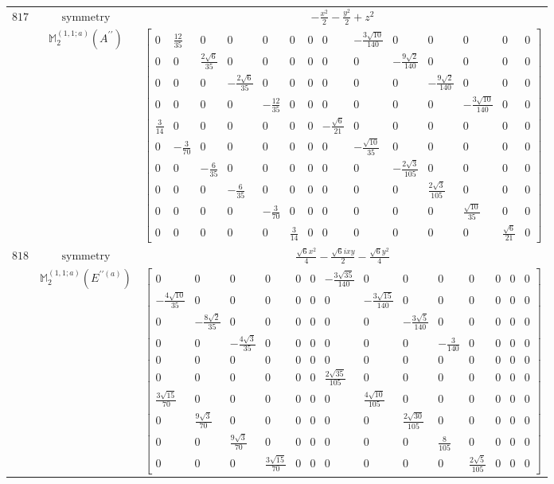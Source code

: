 \documentclass[fleqn,8pt,landscape]{jsarticle}
\begin{document}
\begin{longtable}{ccc}
$ 817 $ & $ \text{symmetry} $ & $ - \frac{x^{2}}{2} - \frac{y^{2}}{2} + z^{2} $ \\
$  $ & $ \mathbb{M}_{2}^{(1,1;a)}(A^{\prime\prime}) $ & $ \begin{bmatrix} 0 & \frac{12}{35} & 0 & 0 & 0 & 0 & 0 & 0 & - \frac{3 \sqrt{10}}{140} & 0 & 0 & 0 & 0 & 0 \\ 0 & 0 & \frac{2 \sqrt{6}}{35} & 0 & 0 & 0 & 0 & 0 & 0 & - \frac{9 \sqrt{2}}{140} & 0 & 0 & 0 & 0 \\ 0 & 0 & 0 & - \frac{2 \sqrt{6}}{35} & 0 & 0 & 0 & 0 & 0 & 0 & - \frac{9 \sqrt{2}}{140} & 0 & 0 & 0 \\ 0 & 0 & 0 & 0 & - \frac{12}{35} & 0 & 0 & 0 & 0 & 0 & 0 & - \frac{3 \sqrt{10}}{140} & 0 & 0 \\ \frac{3}{14} & 0 & 0 & 0 & 0 & 0 & 0 & - \frac{\sqrt{6}}{21} & 0 & 0 & 0 & 0 & 0 & 0 \\ 0 & - \frac{3}{70} & 0 & 0 & 0 & 0 & 0 & 0 & - \frac{\sqrt{10}}{35} & 0 & 0 & 0 & 0 & 0 \\ 0 & 0 & - \frac{6}{35} & 0 & 0 & 0 & 0 & 0 & 0 & - \frac{2 \sqrt{3}}{105} & 0 & 0 & 0 & 0 \\ 0 & 0 & 0 & - \frac{6}{35} & 0 & 0 & 0 & 0 & 0 & 0 & \frac{2 \sqrt{3}}{105} & 0 & 0 & 0 \\ 0 & 0 & 0 & 0 & - \frac{3}{70} & 0 & 0 & 0 & 0 & 0 & 0 & \frac{\sqrt{10}}{35} & 0 & 0 \\ 0 & 0 & 0 & 0 & 0 & \frac{3}{14} & 0 & 0 & 0 & 0 & 0 & 0 & \frac{\sqrt{6}}{21} & 0 \end{bmatrix} $ \\ \hline
$ 818 $ & $ \text{symmetry} $ & $ \frac{\sqrt{6} x^{2}}{4} - \frac{\sqrt{6} i x y}{2} - \frac{\sqrt{6} y^{2}}{4} $ \\
$  $ & $ \mathbb{M}_{2}^{(1,1;a)}(E^{\prime\prime(a)}) $ & $ \begin{bmatrix} 0 & 0 & 0 & 0 & 0 & 0 & - \frac{3 \sqrt{35}}{140} & 0 & 0 & 0 & 0 & 0 & 0 & 0 \\ - \frac{4 \sqrt{10}}{35} & 0 & 0 & 0 & 0 & 0 & 0 & - \frac{3 \sqrt{15}}{140} & 0 & 0 & 0 & 0 & 0 & 0 \\ 0 & - \frac{8 \sqrt{2}}{35} & 0 & 0 & 0 & 0 & 0 & 0 & - \frac{3 \sqrt{5}}{140} & 0 & 0 & 0 & 0 & 0 \\ 0 & 0 & - \frac{4 \sqrt{3}}{35} & 0 & 0 & 0 & 0 & 0 & 0 & - \frac{3}{140} & 0 & 0 & 0 & 0 \\ 0 & 0 & 0 & 0 & 0 & 0 & 0 & 0 & 0 & 0 & 0 & 0 & 0 & 0 \\ 0 & 0 & 0 & 0 & 0 & 0 & \frac{2 \sqrt{35}}{105} & 0 & 0 & 0 & 0 & 0 & 0 & 0 \\ \frac{3 \sqrt{15}}{70} & 0 & 0 & 0 & 0 & 0 & 0 & \frac{4 \sqrt{10}}{105} & 0 & 0 & 0 & 0 & 0 & 0 \\ 0 & \frac{9 \sqrt{3}}{70} & 0 & 0 & 0 & 0 & 0 & 0 & \frac{2 \sqrt{30}}{105} & 0 & 0 & 0 & 0 & 0 \\ 0 & 0 & \frac{9 \sqrt{3}}{70} & 0 & 0 & 0 & 0 & 0 & 0 & \frac{8}{105} & 0 & 0 & 0 & 0 \\ 0 & 0 & 0 & \frac{3 \sqrt{15}}{70} & 0 & 0 & 0 & 0 & 0 & 0 & \frac{2 \sqrt{5}}{105} & 0 & 0 & 0 \end{bmatrix} $ \\ \hline

\end{longtable}
\end{document}
